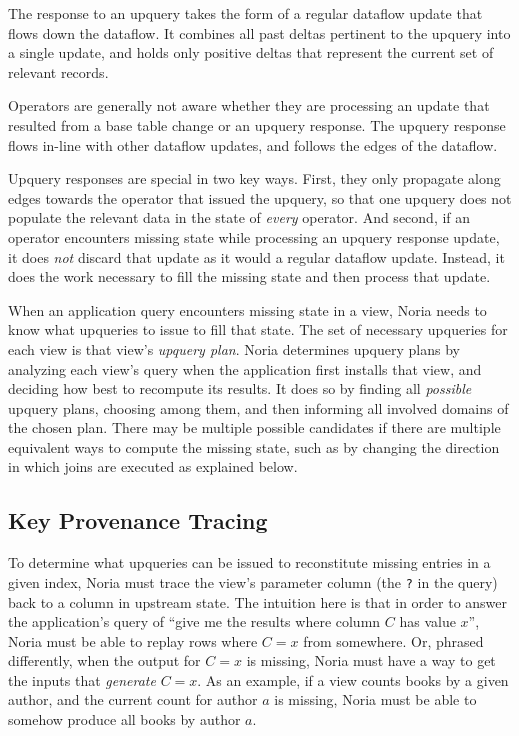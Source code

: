 The response to an upquery takes the form of a regular dataflow update that
flows down the dataflow. It combines all past deltas pertinent to the upquery
into a single update, and holds only positive deltas that represent the current
set of relevant records.

Operators are generally not aware whether they are processing an update that
resulted from a base table change or an upquery response. The upquery response
flows in-line with other dataflow updates, and follows the edges of the
dataflow.

Upquery responses are special in two key ways. First, they only propagate along
edges towards the operator that issued the upquery, so that one upquery does not
populate the relevant data in the state of \emph{every} operator. And second,
if an operator encounters missing state while processing an upquery response
update, it does \emph{not} discard that update as it would a regular dataflow
update. Instead, it does the work necessary to fill the missing state and then
process that update.

When an application query encounters missing state in a view, Noria needs to
know what upqueries to issue to fill that state. The set of necessary upqueries
for each view is that view's \textit{upquery plan}. Noria determines upquery
plans by analyzing each view's query when the application first installs that
view, and deciding how best to recompute its results. It does so by finding all
\emph{possible} upquery plans, choosing among them, and then informing all
involved domains of the chosen plan. There may be multiple possible candidates
if there are multiple equivalent ways to compute the missing state, such as by
changing the direction in which joins are executed as explained below.

\subsection{Key Provenance Tracing}

To determine what upqueries can be issued to reconstitute missing entries in a
given index, Noria must trace the view's parameter column (the \texttt{?} in the
query) back to a column in upstream state. The intuition here is that in order
to answer the application's query of ``give me the results where column $C$ has
value $x$'', Noria must be able to replay rows where $C = x$ from somewhere. Or,
phrased differently, when the output for $C = x$ is missing, Noria must have a
way to get the inputs that \emph{generate} $C = x$. As an example, if a view
counts books by a given author, and the current count for author $a$ is missing,
Noria must be able to somehow produce all books by author $a$.

